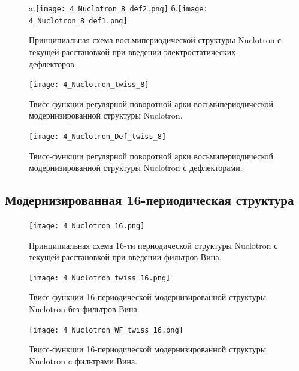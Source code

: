 \begin{figure}[!h]
  \centering
   a.\texttt{[image: 4\_Nuclotron\_8\_def2.png]}
   б.\texttt{[image: 4\_Nuclotron\_8\_def1.png]}
   \caption{Принципиальная схема восьмипериодической структуры Nuclotron с текущей расстановкой при введении электростатических дефлекторов.}
   \label{fig:4_Nuclotron_8}
\end{figure}

\begin{figure}[!h]
  \centering
   \texttt{[image: 4\_Nuclotron\_twiss\_8]}
   \caption{Твисс-функции регулярной поворотной арки восьмипериодической модернизированной структуры Nuclotron.}
   \label{fig:4_Nuclotron_twiss_8}
\end{figure}

\begin{figure}[!h]
  \centering
   \texttt{[image: 4\_Nuclotron\_Def\_twiss\_8]}
   \caption{Твисс-функции регулярной поворотной арки восьмипериодической модернизированной структуры Nuclotron с дефлекторами.}
   \label{fig:4_Nuclotron_Def_twiss_8}
\end{figure}

\newpage
	\subsection{Модернизированная 16-периодическая структура}\label{sec:EDM/optics/16period}

\begin{figure}[!h]
  \centering
   \texttt{[image: 4\_Nuclotron\_16.png]}
   \caption{Принципиальная схема 16-ти периодической структуры Nuclotron с текущей расстановкой при введении фильтров Вина.}
   \label{fig:4_Nuclotron_16}
\end{figure}

\begin{figure}[!h]
  \centering
   \texttt{[image: 4\_Nuclotron\_twiss\_16.png]}
   \caption{Твисс-функции 16-периодической модернизированной структуры Nuclotron без фильтров Вина.}
   \label{fig:4_Nuclotron_twiss_16}
\end{figure}

\begin{figure}[!h]
  \centering
   \texttt{[image: 4\_Nuclotron\_WF\_twiss\_16.png]}
   \caption{Твисс-функции 16-периодической модернизированной структуры Nuclotron c фильтрами Вина.}
   \label{fig:4_Nuclotron_twiss_16_WF}
\end{figure}

